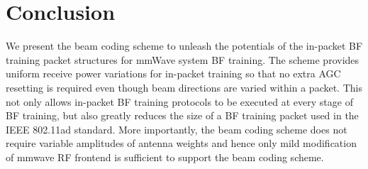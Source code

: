 \documentclass[10pt,conference]{IEEEtran}
\begin{document}
\section{Conclusion}
We present the beam coding scheme to unleash the potentials of the in-packet BF training packet structures for
mmWave system BF training. The scheme provides uniform receive power variations for in-packet training so that no extra AGC resetting is required even though beam directions are varied within a packet. This not only allows in-packet BF training protocols to be executed at every stage of BF training, but also greatly reduces the size of a BF training packet used in the IEEE 802.11ad standard. More importantly, the beam coding scheme does not require variable amplitudes of antenna weights and hence only mild modification of mmwave RF frontend is sufficient to support the beam coding scheme.























\end{document}

